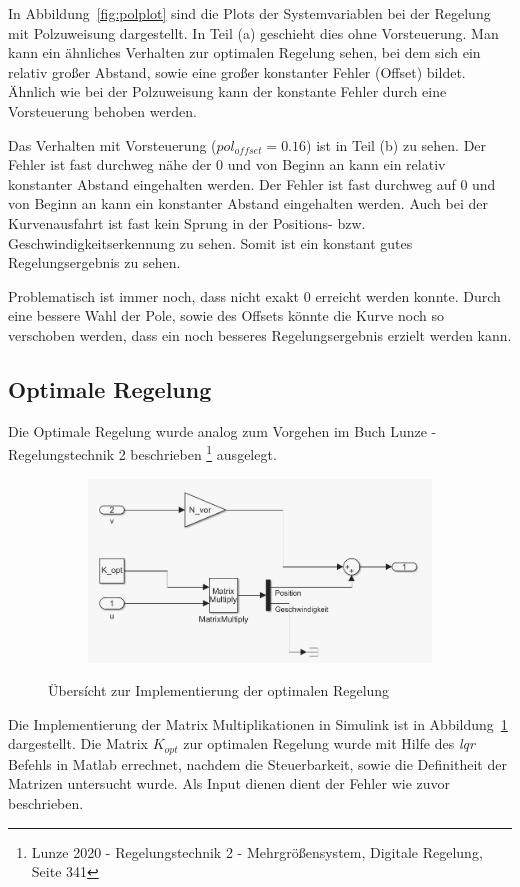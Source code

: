 In Abbildung~\ref{fig:polplot} sind die Plots der Systemvariablen bei der
Regelung mit Polzuweisung dargestellt. In Teil (a) geschieht dies ohne
Vorsteuerung. Man kann ein ähnliches Verhalten zur optimalen Regelung
sehen, bei dem sich ein relativ großer Abstand, sowie eine großer konstanter
Fehler (Offset) bildet. Ähnlich wie bei der Polzuweisung kann der konstante
Fehler durch eine Vorsteuerung behoben werden.

Das Verhalten mit Vorsteuerung ($pol_{offset} = 0.16$) ist in Teil (b) zu sehen.
Der Fehler ist fast durchweg nähe der 0 und von Beginn an kann ein relativ
konstanter Abstand eingehalten werden. Der Fehler ist fast durchweg auf 0 und
von Beginn an kann ein konstanter Abstand eingehalten werden. Auch bei der
Kurvenausfahrt ist fast kein Sprung in der Positions- bzw.
Geschwindigkeitserkennung zu sehen.  Somit ist ein konstant gutes
Regelungsergebnis zu sehen. 

Problematisch ist immer noch, dass nicht exakt 0 erreicht werden konnte. Durch
eine bessere Wahl der Pole, sowie des Offsets könnte die Kurve noch so
verschoben werden, dass ein noch besseres Regelungsergebnis erzielt werden
kann.

\subsection{Optimale Regelung}\label{subsec:optimale_regelung}
Die Optimale Regelung wurde analog zum Vorgehen im Buch Lunze - Regelungstechnik
2 beschrieben \footnote{Lunze 2020 - Regelungstechnik 2 - Mehrgrößensystem,
Digitale Regelung, Seite 341} ausgelegt.
\begin{figure}[hbt]
\centering
\begin{subfigure}{0.49\textwidth}
    \centering
    \includegraphics*[width=\textwidth]{figures/opt_reg.png}
\end{subfigure}
    \caption{Übersícht zur Implementierung der optimalen Regelung
    \label{fig:optreg}}
\end{figure}    
Die Implementierung der Matrix Multiplikationen in Simulink ist in
Abbildung~\ref{fig:optreg} dargestellt. Die Matrix $K_{opt}$ zur optimalen Regelung
wurde mit Hilfe des \textit{lqr} Befehls in Matlab errechnet, nachdem die
Steuerbarkeit, sowie die Definitheit der Matrizen untersucht wurde. Als Input
dienen dient der Fehler wie zuvor beschrieben.

